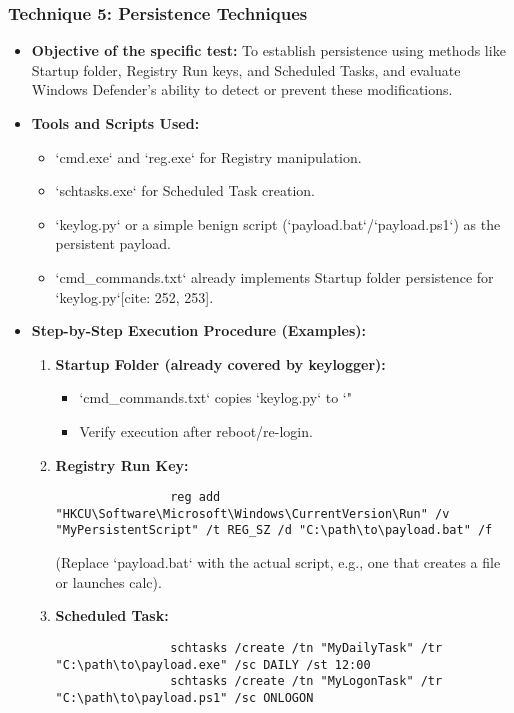 \documentclass[11pt]{article}
\begin{document}
	\subsubsection{Technique 5: Persistence Techniques}
	\begin{itemize}
		\item \textbf{Objective of the specific test:} To establish persistence using methods like Startup folder, Registry Run keys, and Scheduled Tasks, and evaluate Windows Defender's ability to detect or prevent these modifications.
		\item \textbf{Tools and Scripts Used:}
		\begin{itemize}
			\item `cmd.exe` and `reg.exe` for Registry manipulation.
			\item `schtasks.exe` for Scheduled Task creation.
			\item `keylog.py` or a simple benign script (`payload.bat`/`payload.ps1`) as the persistent payload.
			\item `cmd_commands.txt` already implements Startup folder persistence for `keylog.py`[cite: 252, 253].
		\end{itemize}
		\item \textbf{Step-by-Step Execution Procedure (Examples):}
		\begin{enumerate}
			\item \textbf{Startup Folder (already covered by keylogger):}
			\begin{itemize}
				\item `cmd_commands.txt` copies `keylog.py` to `"%
				\item Verify execution after reboot/re-login.
			\end{itemize}
			\item \textbf{Registry Run Key:}
			\begin{verbatim}
				reg add "HKCU\Software\Microsoft\Windows\CurrentVersion\Run" /v "MyPersistentScript" /t REG_SZ /d "C:\path\to\payload.bat" /f
			\end{verbatim}
			(Replace `payload.bat` with the actual script, e.g., one that creates a file or launches calc).
			\item \textbf{Scheduled Task:}
			\begin{verbatim}
				schtasks /create /tn "MyDailyTask" /tr "C:\path\to\payload.exe" /sc DAILY /st 12:00
				schtasks /create /tn "MyLogonTask" /tr "C:\path\to\payload.ps1" /sc ONLOGON
			\end{verbatim}

\end{enumerate}
\end{itemize}
\end{document}
